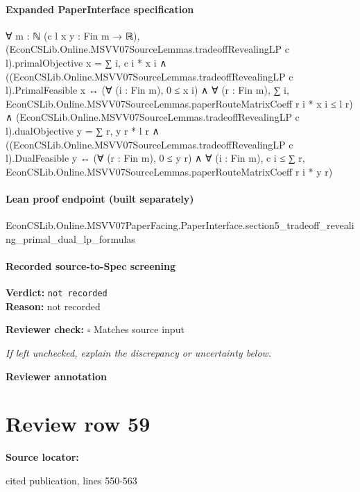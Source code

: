\documentclass[10pt]{article}
\newcommand{\reviewerbox}{%
  \par\noindent\fbox{\parbox{0.96\linewidth}{\rule{0pt}{0.38in}}}\par
}
\newcommand{\reviewmatch}[1]{%
  \par\noindent\textbf{Reviewer check:} $\square$\; #1\par
  \noindent\emph{If left unchecked, explain the discrepancy or uncertainty below.}\par
}
\begin{document}
\paragraph{Expanded PaperInterface specification}
\begin{ReviewVerbatim}
∀ {m : ℕ} (c l x y : Fin m → ℝ),
  (EconCSLib.Online.MSVV07SourceLemmas.tradeoffRevealingLP c l).primalObjective x = ∑ i, c i * x i ∧
    ((EconCSLib.Online.MSVV07SourceLemmas.tradeoffRevealingLP c l).PrimalFeasible x ↔
        (∀ (i : Fin m), 0 ≤ x i) ∧
          ∀ (r : Fin m), ∑ i, EconCSLib.Online.MSVV07SourceLemmas.paperRouteMatrixCoeff r i * x i ≤ l r) ∧
      (EconCSLib.Online.MSVV07SourceLemmas.tradeoffRevealingLP c l).dualObjective y = ∑ r, y r * l r ∧
        ((EconCSLib.Online.MSVV07SourceLemmas.tradeoffRevealingLP c l).DualFeasible y ↔
          (∀ (r : Fin m), 0 ≤ y r) ∧
            ∀ (i : Fin m), c i ≤ ∑ r, EconCSLib.Online.MSVV07SourceLemmas.paperRouteMatrixCoeff r i * y r)
\end{ReviewVerbatim}

\paragraph{Lean proof endpoint (built separately)}\begin{ReviewVerbatim}
EconCSLib.Online.MSVV07PaperFacing.PaperInterface.section5_tradeoff_revealing_primal_dual_lp_formulas
\end{ReviewVerbatim}

\paragraph{Recorded source-to-Spec screening}
\textbf{Verdict:} \texttt{not recorded}
\\
\textbf{Reason:} not recorded
\reviewmatch{Matches source input}
\noindent\textbf{Reviewer annotation}\par
\reviewerbox
\clearpage
\hypertarget{source-claim-cb690fe905e1b34b}{}
\section*{Review row 59}
\textbf{Source locator:} {\footnotesize\raggedright cited publication, lines 550-\allowbreak{}563\par}
\end{document}
